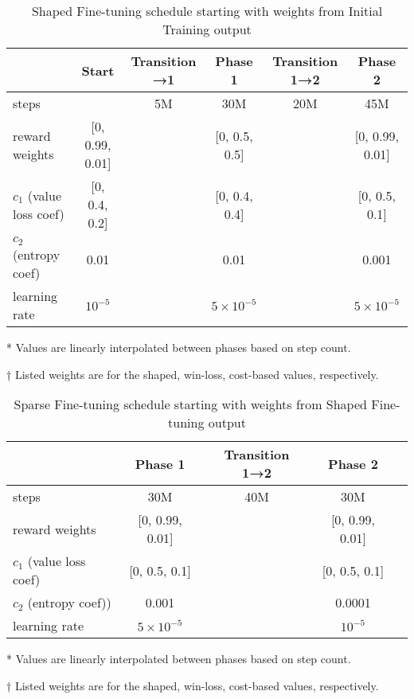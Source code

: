 \documentclass{article}
\begin{document}
\begin{table}[H]
    \centering
    \begin{threeparttable}
    \caption{Shaped Fine-tuning schedule starting with weights from Initial Training output}
    \label{tab:shaped-finetuning-schedule}
    \begin{tabular}{lccccc}
    \toprule
     & Start & Transition →1\tnote{*} & Phase 1 & Transition 1→2\tnote{*} & Phase 2 \\
     \midrule
    steps & & 5M & 30M & 20M & 45M \\
    reward weights\tnote{†} & [0, 0.99, 0.01] & & [0, 0.5, 0.5] & & [0, 0.99, 0.01] \\
    $c_1$ (value loss coef)\tnote{†} & [0, 0.4, 0.2] & & [0, 0.4, 0.4] & & [0, 0.5, 0.1]\\
    $c_2$ (entropy coef) & 0.01 & & 0.01 & & 0.001 \\
    learning rate & $10^{-5}$ & & $5 \times 10^{-5}$ & & $5 \times 10^{-5}$\\
    \bottomrule
    \end{tabular}
    \begin{tablenotes}
       \item[*] Values are linearly interpolated between phases based on step count.
       \item[†] Listed weights are for the shaped, win-loss, cost-based values, respectively.
    \end{tablenotes}
    \end{threeparttable}
\end{table}

\begin{table}[H]
    \centering
    \begin{threeparttable}
    \caption{Sparse Fine-tuning schedule starting with weights from Shaped Fine-tuning output}
    \label{tab:sparse-finetuning-schedule}
    \begin{tabular}{lcccc}
    \toprule
     & Phase 1 & Transition 1→2\tnote{*} & Phase 2 \\
     \midrule
    steps & 30M & 40M & 30M \\
    reward weights\tnote{†} & [0, 0.99, 0.01] &  & [0, 0.99, 0.01] \\
    $c_1$ (value loss coef)\tnote{†} & [0, 0.5, 0.1] &  & [0, 0.5, 0.1]\\
    $c_2$ (entropy coef)) & 0.001 & & 0.0001 \\
    learning rate & $5 \times 10^{-5}$ & & $10^{-5}$ \\
    \bottomrule
    \end{tabular}
    \begin{tablenotes}
       \item[*] Values are linearly interpolated between phases based on step count.
       \item[†] Listed weights are for the shaped, win-loss, cost-based values, respectively.
    \end{tablenotes}
    \end{threeparttable}
\end{table}
\end{document}
